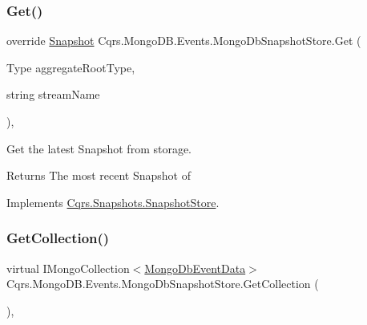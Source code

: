 \subsubsection{\texorpdfstring{Get()}{Get()}}
{\footnotesize\ttfamily override \hyperlink{classCqrs_1_1Snapshots_1_1Snapshot}{Snapshot} Cqrs.\+Mongo\+D\+B.\+Events.\+Mongo\+Db\+Snapshot\+Store.\+Get (\begin{DoxyParamCaption}\item[{Type}]{aggregate\+Root\+Type,  }\item[{string}]{stream\+Name }\end{DoxyParamCaption})\hspace{0.3cm}{\ttfamily [protected]}, {\ttfamily [virtual]}}



Get the latest Snapshot from storage. 

\begin{DoxyReturn}{Returns}
The most recent Snapshot of
\end{DoxyReturn}


Implements \hyperlink{classCqrs_1_1Snapshots_1_1SnapshotStore_ab2ecab1a665c0f2097929d028fe4ac69_ab2ecab1a665c0f2097929d028fe4ac69}{Cqrs.\+Snapshots.\+Snapshot\+Store}.

\mbox{\label{classCqrs_1_1MongoDB_1_1Events_1_1MongoDbSnapshotStore_a995fcf56b131f6ac7f389a27992cf2ce_a995fcf56b131f6ac7f389a27992cf2ce}} 
\subsubsection{\texorpdfstring{Get\+Collection()}{GetCollection()}}
{\footnotesize\ttfamily virtual I\+Mongo\+Collection$<$\hyperlink{classCqrs_1_1MongoDB_1_1Events_1_1MongoDbEventData}{Mongo\+Db\+Event\+Data}$>$ Cqrs.\+Mongo\+D\+B.\+Events.\+Mongo\+Db\+Snapshot\+Store.\+Get\+Collection (\begin{DoxyParamCaption}{ }\end{DoxyParamCaption})\hspace{0.3cm}{\ttfamily [protected]}, {\ttfamily [virtual]}}



